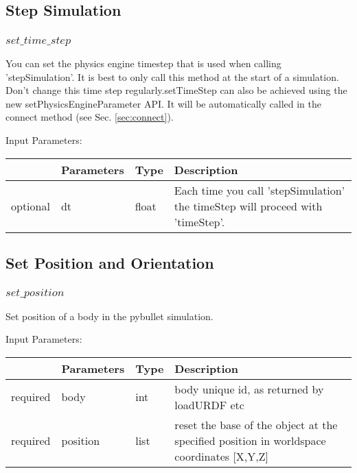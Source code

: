 \documentclass[
	ngerman,
	accentcolor=9c,%
	type=intern,
	marginpar=false
	]{tudapub}
\begin{document}
\vspace{0.5cm}

\subsection{Step Simulation}
\subsubsection{$set\_time\_step$}
\label{sec:step_time}
\noindent You can set the physics engine timestep that is used when calling 'stepSimulation'. It is best to only call this method at the start of a simulation. Don't change this time step regularly.setTimeStep can also be achieved using the new setPhysicsEngineParameter API. It will be automatically called in the connect method (see Sec. \ref{sec:connect}).


\vspace{0.5cm}
\noindent Input Parameters:
\vspace{0.5cm}

\begin{tabular}{|p{}|p{}|p{}| p{}|}
\hline
 & \textbf{Parameters} & \textbf{Type} & \textbf{Description} \\
\hline
optional & dt & float &  Each time you call 'stepSimulation' the timeStep will proceed with 'timeStep'.  \\
\hline
\end{tabular}


\vspace{0.5cm}
\subsection{Set Position and Orientation}
\label{sec:pos_ori}
\subsubsection{$set\_position$}
\noindent Set position of a body in the pybullet simulation.


\vspace{0.5cm}
\noindent Input Parameters:
\vspace{0.5cm}

\begin{tabular}{|p{}|p{}|p{}| p{}|}
\hline
 & \textbf{Parameters} & \textbf{Type} & \textbf{Description} \\
\hline
required & body & int & body unique id, as returned by loadURDF etc \\
\hline
required & position & list & reset the base of the object at the specified position in worldspace coordinates [X,Y,Z] \\
\hline
\end{tabular}
\end{document}
